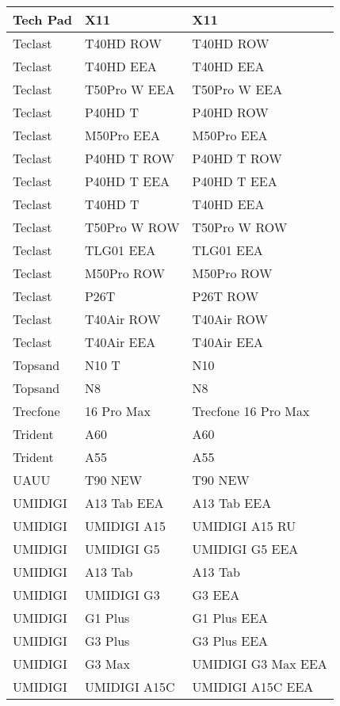 \begin{tabularx}{\linewidth}{|l|X|X|}
        Tech Pad & X11 & X11 \\ \hline
        Teclast & T40HD ROW & T40HD ROW \\ \hline
        Teclast & T40HD EEA & T40HD EEA \\ \hline
        Teclast & T50Pro W EEA & T50Pro W EEA \\ \hline
        Teclast & P40HD T & P40HD ROW \\ \hline
        Teclast & M50Pro EEA & M50Pro EEA \\ \hline
        Teclast & P40HD T ROW & P40HD T ROW \\ \hline
        Teclast & P40HD T EEA & P40HD T EEA \\ \hline
        Teclast & T40HD T & T40HD EEA \\ \hline
        Teclast & T50Pro W ROW & T50Pro W ROW \\ \hline
        Teclast & TLG01 EEA & TLG01 EEA \\ \hline
        Teclast & M50Pro ROW & M50Pro ROW \\ \hline
        Teclast & P26T & P26T ROW \\ \hline
        Teclast & T40Air ROW & T40Air ROW \\ \hline
        Teclast & T40Air EEA & T40Air EEA \\ \hline
        Topsand & N10 T & N10 \\ \hline
        Topsand & N8 & N8 \\ \hline
        Trecfone & 16 Pro Max & Trecfone 16 Pro Max \\ \hline
        Trident & A60 & A60 \\ \hline
        Trident & A55 & A55 \\ \hline
        UAUU & T90 NEW & T90 NEW \\ \hline
        UMIDIGI & A13 Tab EEA & A13 Tab EEA \\ \hline
        UMIDIGI & UMIDIGI A15 & UMIDIGI A15 RU \\ \hline
        UMIDIGI & UMIDIGI G5 & UMIDIGI G5 EEA \\ \hline
        UMIDIGI & A13 Tab & A13 Tab \\ \hline
        UMIDIGI & UMIDIGI G3 & G3 EEA \\ \hline
        UMIDIGI & G1 Plus & G1 Plus EEA \\ \hline
        UMIDIGI & G3 Plus & G3 Plus EEA \\ \hline
        UMIDIGI & G3 Max & UMIDIGI G3 Max EEA \\ \hline
        UMIDIGI & UMIDIGI A15C & UMIDIGI A15C EEA \\ \hline

\end{tabularx}
